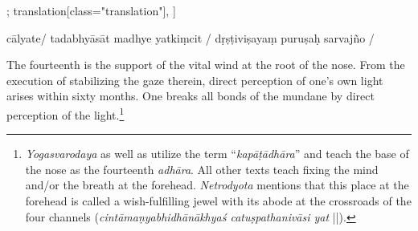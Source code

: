 \begin{alignment}[
  texts=edition[class="edition"];
  translation[class="translation"],
  ]
\begin{edition}
\begin{prose}
{  
  }
cālyate/
tadabhyāsāt
madhye
yatkiṃcit
/
dṛṣṭiviṣayaṃ
puruṣaḥ
sarvajño 
/
    \end{prose}
  \end{edition}
  \begin{translation}
    \begin{tlate}
      \noindent
      The fourteenth is the support of the vital wind at the root of the nose. From the execution of stabilizing the gaze therein, direct perception of one's own light arises within sixty months. One breaks all bonds of the mundane by direct perception of the light.\footnote{\textit{Yogasvarodaya} as well as  utilize the term ``\textit{kapāṭādhāra}'' and  teach the base of the nose as the fourteenth \textit{adhāra}. All other texts teach fixing the mind and/or the breath at the forehead. \textit{Netrodyota} mentions that this place at the forehead is called a wish-fulfilling jewel with its abode at the crossroads of the four channels (\textit{cintāmaṇyabhidhānākhyaś catuṣpathanivāsi yat} ||).}     
            

\end{tlate}
\end{translation}
\end{alignment}
